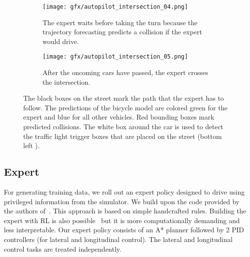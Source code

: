 \begin{figure}
    \begin{subfigure}[b]{0.48\textwidth}
        \centering
        \texttt{[image: gfx/autopilot\_intersection\_04.png]}
        \caption{The expert waits before taking the turn because the trajectory forecasting predicts a collision if the expert would drive.}
        \label{fig:expert1}
    \end{subfigure}
    \hfill
    \vspace{0.15cm}
    \begin{subfigure}[b]{0.48\textwidth}
        \centering
        \texttt{[image: gfx/autopilot\_intersection\_05.png]}
        \caption{After the oncoming cars have passed, the expert crosses the intersection.}
        \label{fig:expert2}
    \end{subfigure}
    \vspace{0.0cm}
    \caption{\label{fig:expert} The black boxes on the street mark the path that the expert has to follow. The predictions of the bicycle model are colored green for the expert and blue for all other vehicles. Red bounding boxes mark predicted collisions. The white box around the car is used to detect the traffic light trigger boxes that are placed on the street (\eg bottom left ).}
\end{figure}

\subsection{Expert}
For generating training data, we roll out an expert policy designed to drive using privileged information from the simulator.  We build upon the code provided by the authors of~\cite{Chen2019CORL}. This approach is based on simple handcrafted rules. Building the expert with RL is also possible~\cite{Zhang2021ICCV, Agarwal2021ARXIV} but it is more computationally demanding and less interpretable. Our expert policy consists of an A* planner followed by 2 PID controllers (for lateral and longitudinal control). The lateral and longitudinal control tasks are treated independently.

